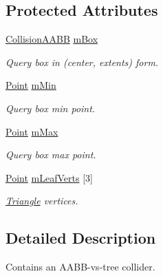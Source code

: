 \subsection*{Protected Attributes}
\begin{DoxyCompactItemize}
\item 
\hyperlink{classCollisionAABB}{Collision\+A\+A\+BB} \hyperlink{classAABBCollider_aef6bd97ceed9bca72a3896aa3e41749e}{m\+Box}\hypertarget{classAABBCollider_aef6bd97ceed9bca72a3896aa3e41749e}{}\label{classAABBCollider_aef6bd97ceed9bca72a3896aa3e41749e}

\begin{DoxyCompactList}\small\item\em Query box in (center, extents) form. \end{DoxyCompactList}\item 
\hyperlink{classPoint}{Point} \hyperlink{classAABBCollider_a8c00192504356f5016957e9a034dfeeb}{m\+Min}\hypertarget{classAABBCollider_a8c00192504356f5016957e9a034dfeeb}{}\label{classAABBCollider_a8c00192504356f5016957e9a034dfeeb}

\begin{DoxyCompactList}\small\item\em Query box min point. \end{DoxyCompactList}\item 
\hyperlink{classPoint}{Point} \hyperlink{classAABBCollider_af40446c606f2d4a02d515a58696d272d}{m\+Max}\hypertarget{classAABBCollider_af40446c606f2d4a02d515a58696d272d}{}\label{classAABBCollider_af40446c606f2d4a02d515a58696d272d}

\begin{DoxyCompactList}\small\item\em Query box max point. \end{DoxyCompactList}\item 
\hyperlink{classPoint}{Point} \hyperlink{classAABBCollider_a3357982377483d5d131721ae72e36643}{m\+Leaf\+Verts} \mbox{[}3\mbox{]}\hypertarget{classAABBCollider_a3357982377483d5d131721ae72e36643}{}\label{classAABBCollider_a3357982377483d5d131721ae72e36643}

\begin{DoxyCompactList}\small\item\em \hyperlink{classTriangle}{Triangle} vertices. \end{DoxyCompactList}\end{DoxyCompactItemize}


\subsection{Detailed Description}
Contains an A\+A\+B\+B-\/vs-\/tree collider.

